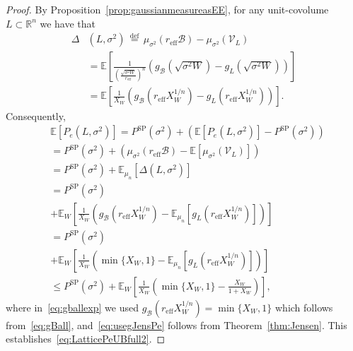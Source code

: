 \documentclass[article,doublecolumn]{IEEEtran}
\newcommand{\EE}{{\mathbb{E}}}
\newcommand{\df}{{\, \stackrel{\mathrm{def}}{=}\, }}
\newcommand{\R}{{\mathbb{R}}}
\newcommand{\Ind}{\mathds{1}}
\newcommand{\mVL}{{\mathcal{V}_L}}
\newcommand{\mBeuc}{{\mathcal{B}}}
\newcommand{\reff}{{r_{\mathrm{eff}}}}
\newcommand{\VcdfL}{g_L}
\newcommand{\VcdfB}{g_{\mathcal{B}}}
\begin{document}
\begin{proof}
By Proposition~\ref{prop:gaussianmeasureasEE}, for any unit-covolume $L\subset\R^n$ we have that
\begin{align}
\Delta&(L,\sigma^2)\df   \mu_{\sigma^2}(\reff\mBeuc)-\mu_{\sigma^2}(\mVL)\\
&=\EE\left[\frac{1}{\left(\frac{\sqrt{\sigma^2 W}}{\reff} \right)^{n}}\left(\VcdfB(\sqrt{\sigma^2 W}) -\VcdfL(\sqrt{\sigma^2 W})\right)\right]\\
&=\EE\left[\frac{1}{X_W}\left(\VcdfB\left(\reff X_W^{1/n}\right) -\VcdfL\left(\reff X_W^{1/n}\right)\right)\right].
\end{align}
Consequently,
\begin{align}
&\mathbb{E}[P_e(L,\sigma^2)]=P^{\mathrm{SP}}(\sigma^2)+\left(\mathbb{E}[P_e(L,\sigma^2)]-P^{\mathrm{SP}}(\sigma^2)\right)\\
&=P^{\mathrm{SP}}(\sigma^2)+\left(\mu_{\sigma^2}(\reff\mBeuc)-\EE[\mu_{\sigma^2}(\mVL)]\right)\\
&=P^{\mathrm{SP}}(\sigma^2)+\EE_{\mu_n}[\Delta(L,\sigma^2)]\\
&=P^{\mathrm{SP}}(\sigma^2)\nonumber\\
&+\EE_{W}\left[\frac{1}{X_W}\left(\VcdfB\left(\reff X_W^{1/n}\right) -\EE_{\mu_n}\left[\VcdfL\left(\reff X_W^{1/n}\right)\right]\right)\right]
\\
&=P^{\mathrm{SP}}(\sigma^2)\nonumber\\
&+\EE_{W}\left[\frac{1}{X_W}\left(\min\{X_W,1\} -\EE_{\mu_n}\left[\VcdfL\left(\reff X_W^{1/n}\right)\right]\right)\right]\label{eq:gballexp}\\
&\leq P^{\mathrm{SP}}(\sigma^2)+\EE_{W}\left[\frac{1}{X_W}\left(\min\{X_W,1\} -\frac{X_W}{1+X_W}\right)\right],\label{eq:usegJensPe}
\end{align}
where in~\eqref{eq:gballexp} we used $\VcdfB\left(\reff X_W^{1/n}\right)=\min\{X_W,1\}$ which follows from~\eqref{eq:gBall}, and~\eqref{eq:usegJensPe} follows from Theorem~\ref{thm:Jensen}. This establishes~\eqref{eq:LatticePeUBfull2}.
\end{proof}
\end{document}

